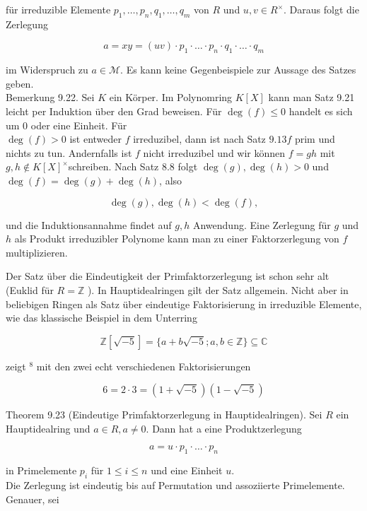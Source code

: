 \documentclass[10pt, letterpaper]{article}
\begin{document}
für irreduzible Elemente $p_{1}, \ldots, p_{n}, q_{1}, \ldots, q_{m}$ von $R$ und $u, v \in R^{\times}$. Daraus folgt die Zerlegung

$$
a=x y=(u v) \cdot p_{1} \cdot \ldots \cdot p_{n} \cdot q_{1} \cdot \ldots \cdot q_{m}
$$

im Widerspruch zu $a \in \mathscr{M}$. Es kann keine Gegenbeispiele zur Aussage des Satzes geben.\\
Bemerkung 9.22. Sei $K$ ein Körper. Im Polynomring $K[X]$ kann man Satz 9.21 leicht per Induktion über den Grad beweisen. Für $\operatorname{deg}(f) \leq 0$ handelt es sich um 0 oder eine Einheit. Für\\
$\operatorname{deg}(f)>0$ ist entweder $f$ irreduzibel, dann ist nach Satz $9.13 f$ prim und nichts zu tun. Andernfalls ist $f$ nicht irreduzibel und wir können $f=g h$ mit $g, h \notin K[X]^{\times}$schreiben. Nach Satz 8.8 folgt $\operatorname{deg}(g), \operatorname{deg}(h)>0$ und $\operatorname{deg}(f)=\operatorname{deg}(g)+\operatorname{deg}(h)$, also

$$
\operatorname{deg}(g), \operatorname{deg}(h)<\operatorname{deg}(f),
$$

und die Induktionsannahme findet auf $g, h$ Anwendung. Eine Zerlegung für $g$ und $h$ als Produkt irreduzibler Polynome kann man zu einer Faktorzerlegung von $f$ multiplizieren.

Der Satz über die Eindeutigkeit der Primfaktorzerlegung ist schon sehr alt (Euklid für $R=\mathbb{Z}$ ). In Hauptidealringen gilt der Satz allgemein. Nicht aber in beliebigen Ringen als Satz über eindeutige Faktorisierung in irreduzible Elemente, wie das klassische Beispiel in dem Unterring

$$
\mathbb{Z}[\sqrt{-5}]=\{a+b \sqrt{-5} ; a, b \in \mathbb{Z}\} \subseteq \mathbb{C}
$$

zeigt ${ }^{8}$ mit den zwei echt verschiedenen Faktorisierungen

$$
6=2 \cdot 3=(1+\sqrt{-5})(1-\sqrt{-5})
$$

Theorem 9.23 (Eindeutige Primfaktorzerlegung in Hauptidealringen). Sei $R$ ein Hauptidealring und $a \in R, a \neq 0$. Dann hat a eine Produktzerlegung

$$
a=u \cdot p_{1} \cdot \ldots \cdot p_{n}
$$

in Primelemente $p_{i}$ für $1 \leq i \leq n$ und eine Einheit $u$.\\
Die Zerlegung ist eindeutig bis auf Permutation und assoziierte Primelemente. Genauer, sei
\end{document}
